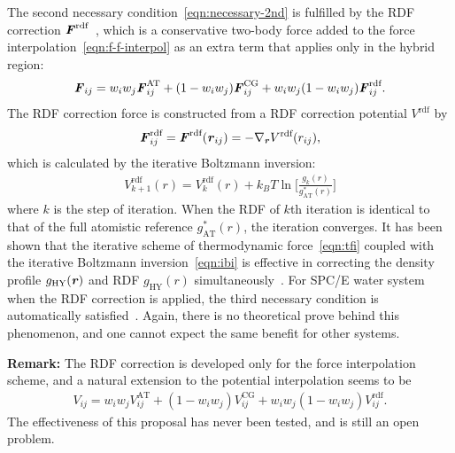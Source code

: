 \documentclass[epjST]{svjour}
\newcommand{\vect}[1]{\textbf{\textit{#1}}}
\newcommand{\AT}[0]{\textrm{AT}}
\newcommand{\HY}[0]{\textrm{HY}}
\newcommand{\CG}[0]{\textrm{CG}}
\newcommand{\moleidxone}[0]{i}
\newcommand{\moleidxtwo}[0]{j}
\newcommand{\rdf}{{\textrm{rdf}}}
\begin{document}
The second necessary condition~\eqref{eqn:necessary-2nd} is fulfilled by the
RDF correction $\vect F^\rdf$~\cite{wang2012adaptive}, which is a conservative two-body force added to the force interpolation~\eqref{eqn:f-f-interpol} as an extra term
that applies only in the hybrid region:
\begin{align}\label{eqn:rdf-corr-f}
  {\vect F}_{\moleidxone \moleidxtwo}
  =
  w_\moleidxone w_\moleidxtwo{\vect F}_{\moleidxone\moleidxtwo}^{\AT}
  +
  (1-w_\moleidxone w_\moleidxtwo){\vect F}^{\CG}_{\moleidxone\moleidxtwo}
  +
  w_\moleidxone w_\moleidxtwo(1-w_\moleidxone w_\moleidxtwo){\vect F}^{\rdf}_{\moleidxone\moleidxtwo}.
\end{align}
The RDF correction force is constructed from a RDF correction potential $V^\rdf$ by
\begin{align}
  \vect F_{\moleidxone\moleidxtwo}^\rdf = \vect F^\rdf(\vect r_{\moleidxone\moleidxtwo})
  = -\nabla_{\vect r} V^\rdf(r_{\moleidxone\moleidxtwo}),
\end{align}
which is calculated by the iterative Boltzmann inversion:
\begin{align}\label{eqn:ibi}
  V_{k+1}^\rdf(r) = V_k^\rdf(r) + k_BT \ln \Big[\frac{g_k(r)}{g^\ast_\AT(r)}\Big] 
\end{align}
where $k$ is the step of iteration. When the RDF of $k$th iteration is
identical to that of the full atomistic reference $g^\ast_\AT(r)$, the
iteration converges. It has been shown that the iterative scheme of
thermodynamic force~\eqref{eqn:tfi} coupled with the iterative Boltzmann inversion~\eqref{eqn:ibi}
is effective in correcting the density profile $g_\HY(\vect r)$ and
RDF $g_\HY(r)$ simultaneously~\cite{wang2012adaptive}.
For SPC/E water system when the RDF correction is applied, the third
necessary condition is automatically satisfied~\cite{wang2013grand}. Again, there is no
theoretical prove behind this phenomenon, and one cannot expect the same
benefit for other systems.

\noindent\textbf{Remark:} The RDF correction is developed only for the force interpolation scheme,
and a natural extension to the potential interpolation seems to be
\begin{align}
  {V}_{\moleidxone \moleidxtwo}
  =
  w_\moleidxone w_\moleidxtwo{V}_{\moleidxone\moleidxtwo}^{\AT}
  +
  (1-w_\moleidxone w_\moleidxtwo){V}^{\CG}_{\moleidxone\moleidxtwo}
  +
  w_\moleidxone w_\moleidxtwo(1-w_\moleidxone w_\moleidxtwo){V}^{\rdf}_{\moleidxone\moleidxtwo}.  
\end{align}
The effectiveness of this proposal has never been tested, and is still an open problem.
\end{document}
